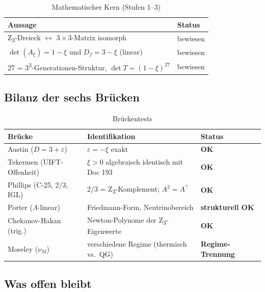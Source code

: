 \begin{table}[h]
\centering
\caption{Mathematischer Kern (Stufen 1--3)}
\begin{tabular}{ll}
\toprule
Aussage & Status \\
\midrule
Z\textsubscript{3}-Dreieck \(\leftrightarrow\) 3\,\(\times\)\,3-Matrix isomorph & bewiesen \\
\(\det(A_\xi) = 1 - \xi\) und \(D_f = 3 - \xi\) (linear) & bewiesen \\
27 = 3\textsuperscript{3}-Generationen-Struktur, \(\det T = (1-\xi)^{27}\) & bewiesen \\
\bottomrule
\end{tabular}
\end{table}

\subsection{Bilanz der sechs Brücken}

\begin{table}[h]
\centering
\caption{Brückentests}
\begin{tabular}{lll}
\toprule
Brücke & Identifikation & Status \\
\midrule
Austin (\(D = 3 + \varepsilon\)) & \(\varepsilon = -\xi\) exakt & {\color{t0green}\textbf{OK}} \\
Tekermen (UIFT-Offenheit) & \(\xi > 0\) algebraisch identisch mit Doc 193 & {\color{t0green}\textbf{OK}} \\
Phillips (C-25, 2/3, IGL) & 2/3 = Z\textsubscript{3}-Komplement; \(A^2 = A^\top\) & {\color{t0green}\textbf{OK}} \\
Porter (\(\Lambda\)-linear) & Friedmann-Form, Neutrinobereich & {\color{t0blue}\textbf{strukturell OK}} \\
Chekanov-Hakan (trig.) & Newton-Polynome der Z\textsubscript{3}-Eigenwerte & {\color{t0green}\textbf{OK}} \\
Moseley (\(\nu_M\)) & verschiedene Regime (thermisch vs.\ QG) & {\color{t0gray}\textbf{Regime-Trennung}} \\
\bottomrule
\end{tabular}
\end{table}

\subsection{Was offen bleibt}

